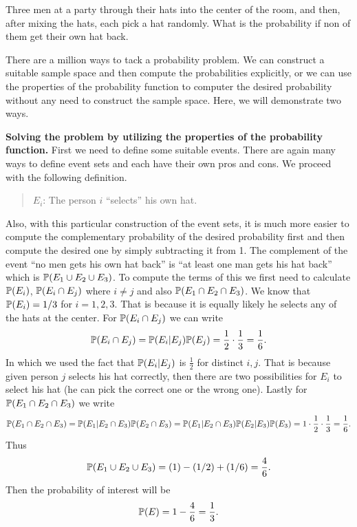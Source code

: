 \begin{problem}
	Three men at a party through their hats into the center of the room, and then, after mixing the hats, each pick a hat randomly. What is the probability if non of them get their own hat back.
\end{problem}
\begin{solution}
	There are a million ways to tack a probability problem. We can construct a suitable sample space and then compute the probabilities explicitly, or we can use the properties of the probability function to computer the desired probability without any need to construct the sample space. Here, we will demonstrate two ways.
	
	\textbf{Solving the problem by utilizing the properties of the probability function.} First we need to define some suitable events. There are again many ways to define event sets and each have their own pros and cons. We proceed with the following definition.
	\begin{quote}
		$E_i$: The person $i$ ``selects'' his own hat.  
	\end{quote}
	Also, with this particular construction of the event sets, it is much more easier to compute the complementary probability of the desired probability first and then compute the desired one by simply subtracting it from 1. The complement of the event ``no men gets his own hat back'' is ``at least one man gets his hat back'' which is $\mathbb{P}(E_1\cup E_2 \cup E_3)$. To compute the terms of this we first need to calculate $\mathbb{P}(E_i)$, $\mathbb{P}(E_i \cap E_j)$ where $i\neq j$ and also $\mathbb{P}(E_1 \cap E_2 \cap E_3)$. We know that $\mathbb{P}(E_i) = 1/3$ for $i=1,2,3$. That is because it is equally likely he selects any of the hats at the center. For $\mathbb{P}(E_i\cap E_j)$ we can write
	\[ \mathbb{P}(E_i\cap E_j) = \mathbb{P}(E_i|E_j)\mathbb{P}(E_j) = \frac{1}{2}\cdot \frac{1}{3} =  \frac{1}{6}.   \]
	In which we used the fact that $\mathbb{P}(E_i|E_j)$ is $\frac{1}{2}$ for distinct $i,j$. That is because given person $j$ selects his hat correctly, then there are two possibilities for $E_i$ to select his hat (he can pick the correct one or the wrong one). Lastly for $\mathbb{P}(E_1\cap E_2\cap E_3)$ we write
	\[ \mathbb{P}(E_1\cap E_2\cap E_3) = \mathbb{P}(E_1|E_2\cap E_3)\mathbb{P}(E_2\cap E_3) = \mathbb{P}(E_1|E_2\cap E_3) \mathbb{P}(E_2 | E_3) \mathbb{P}(E_3) = 1 \cdot \frac{1}{2} \cdot \frac{1}{3} = \frac{1}{6}.  \]
	Thus 
	\[ \mathbb{P}(E_1 \cup E_2 \cup E_3) = (1) - (1/2) + (1/6) = \frac{4}{6}. \]
	Then the probability of interest will be
	\[ \mathbb{P}(E) = 1-\frac{4}{6} = \frac{1}{3}. \]
	

\end{solution}
